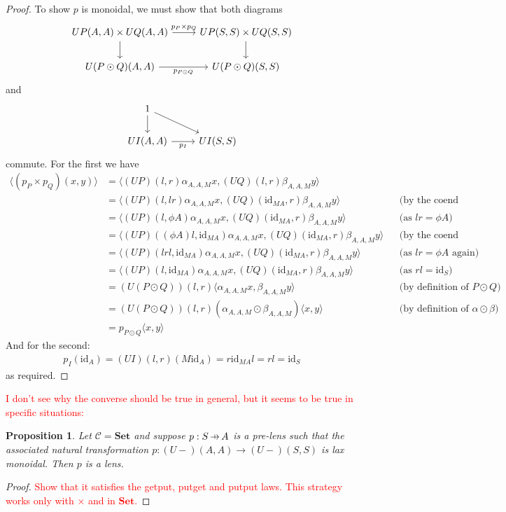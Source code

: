 \documentclass[11pt,a4paper]{article}
\theoremstyle{plain}
\newtheorem{proposition}[theorem]{Proposition}
\theoremstyle{definition}
\newcommand{\C}{\mathscr{C}}
\newcommand{\Set}{\mathbf{Set}}
\newcommand{\id}{\mathrm{id}}
\newcommand{\hto}{\ensuremath{\,\mathaccent\shortmid\rightarrow\,}}
\newcommand{\todo}[1]{\textcolor{red}{\small #1}}
\begin{document}
\begin{proof}
To show $p$ is monoidal, we must show that both diagrams
\[
\begin{tikzcd}
UP(A,A) \times UQ(A,A) \ar[r, "p_P \times p_Q"] \ar[d, swap] & UP(S, S) \times UQ(S, S)  \ar[d] \\
U(P \odot Q)(A,A)  \ar[r, "p_{P \odot Q}", swap] & U(P \odot Q)(S,S)
\end{tikzcd}
\]
and
\[
\begin{tikzcd}
1 \ar[d] \ar[dr] & \\
UI(A,A)  \ar[r, "p_I", swap] & UI(S,S)
\end{tikzcd}
\]
commute. For the first we have
\begin{align*}
\langle (p_P \times p_Q)(x, y) \rangle &= \langle (UP)(l,r) \alpha_{A,A,M} x,  (UQ)(l,r) \beta_{A,A,M} y\rangle \\
&= \langle (UP)(l,lr) \alpha_{A,A,M} x, (UQ)(\id_{MA},r) \beta_{A,A,M} y\rangle && \text{(by the coend relations)} \\
&= \langle (UP)(l,\phi A) \alpha_{A,A,M} x, (UQ)(\id_{MA},r) \beta_{A,A,M} y\rangle && \text{(as $lr = \phi A$)} \\
&= \langle (UP)((\phi A)l,\id_{MA}) \alpha_{A,A,M} x, (UQ)(\id_{MA},r) \beta_{A,A,M} y\rangle && \text{(by the coend relations again)} \\
&= \langle (UP)(lrl,\id_{MA}) \alpha_{A,A,M} x, (UQ)(\id_{MA},r) \beta_{A,A,M} y\rangle && \text{(as $lr = \phi A$ again)} \\
&= \langle (UP)(l,\id_{MA}) \alpha_{A,A,M} x, (UQ)(\id_{MA},r) \beta_{A,A,M} y\rangle && \text{(as $rl = \id_S$)} \\
&= (U(P \odot Q))(l,r) \langle \alpha_{A,A,M} x, \beta_{A,A,M} y \rangle && \text{(by definition of $P \odot Q$)} \\
&= (U(P \odot Q))(l,r) (\alpha_{A,A,M} \odot \beta_{A,A,M}) \langle x, y \rangle && \text{(by definition of $\alpha \odot \beta$)} \\
&= p_{P \odot Q} \langle x, y \rangle
\end{align*}
And for the second:
\begin{align*}
p_I(\id_A) = (UI)(l,r) (M \id_A) = r \id_{MA} l = rl = \id_S
\end{align*}
as required.
\end{proof}

\todo{I don't see why the converse should be true in general, but it seems to be true in specific situations:}

\begin{proposition}
Let $\C = \Set$ and suppose $p : S \hto A$ is a pre-lens such that the associated natural transformation $p : (U-)(A,A) \to (U-)(S,S)$ is lax monoidal. Then $p$ is a lens.
\end{proposition}
\begin{proof}
\todo{Show that it satisfies the getput, putget and putput laws. This strategy works only with $\times$ and in $\Set$.}
\end{proof}
\end{document}
